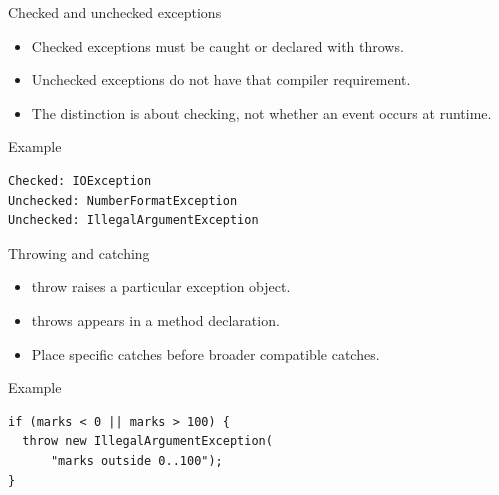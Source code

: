 \documentclass[10pt,aspectratio=169]{beamer}
\begin{document}
\begin{frame}[fragile,t]{Checked and unchecked exceptions}
\begin{itemize}
\item Checked exceptions must be caught or declared with throws.
\item Unchecked exceptions do not have that compiler requirement.
\item The distinction is about checking, not whether an event occurs at runtime.
\end{itemize}
\vspace{1mm}\begin{block}{Example}
\begin{lstlisting}
Checked: IOException
Unchecked: NumberFormatException
Unchecked: IllegalArgumentException
\end{lstlisting}
\end{block}
\end{frame}

\begin{frame}[fragile,t]{Throwing and catching}
\begin{itemize}
\item throw raises a particular exception object.
\item throws appears in a method declaration.
\item Place specific catches before broader compatible catches.
\end{itemize}
\vspace{1mm}\begin{block}{Example}
\begin{lstlisting}
if (marks < 0 || marks > 100) {
  throw new IllegalArgumentException(
      "marks outside 0..100");
}
\end{lstlisting}
\end{block}
\end{frame}
\end{document}
